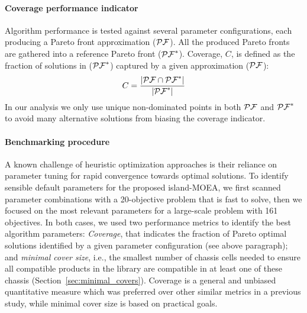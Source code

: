 \paragraph{Coverage performance indicator} \label{sec:coverage_metric}
Algorithm performance is tested against several parameter configurations, each producing a Pareto front approximation ($\mathcal{PF}$). All the produced Pareto fronts are gathered into a reference Pareto front ($\mathcal{PF}^*$).
Coverage, $C$, is defined as the fraction of solutions in ($\mathcal{PF}^*$) captured by  a given approximation ($\mathcal{PF}$):
\begin{equation}
    C = \frac{|\PF \cap \PFs|}{|\PFs|} %
\end{equation}
In our analysis we only use unique non-dominated points in both $\mathcal{PF}$ and $\mathcal{PF}^*$ to avoid many alternative solutions from biasing the coverage indicator.

\paragraph{Benchmarking procedure}
A known challenge of heuristic optimization approaches is their reliance on parameter tuning for rapid convergence towards optimal solutions.
To identify sensible default parameters for the proposed island-MOEA, we first scanned parameter combinations with a 20-objective problem that is fast to solve, then we focused on the most relevant parameters for a large-scale problem with 161 objectives.
In both cases, we used two performance metrics to identify the best algorithm parameters:
\emph{Coverage}, that indicates the fraction of Pareto optimal solutions identified by a given parameter configuration (see above paragraph);
and \emph{minimal cover size}, i.e., the smallest number of chassis cells needed to ensure all compatible products in the library are compatible in at least one of these chassis (Section~\ref{sec:minimal_covers}). Coverage is a general and unbiased quantitative measure which was preferred over other similar metrics in a previous study,\citep{garcia2019c} while minimal cover size is based on practical goals.

